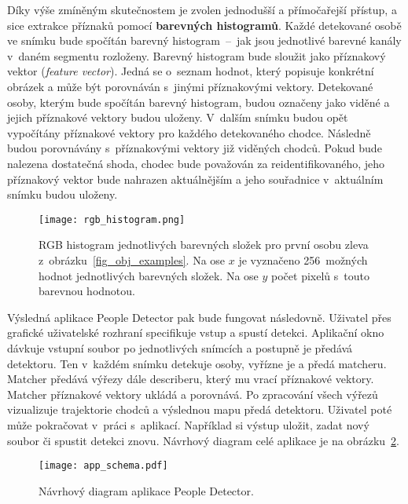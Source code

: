 Díky výše zmíněným skutečnostem je zvolen jednodušší a přímočařejší přístup, a sice extrakce příznaků pomocí \textbf{barevných histogramů}. Každé detekované osobě ve snímku bude spočítán barevný histogram~--~jak jsou jednotlivé barevné kanály v~daném segmentu rozloženy. Barevný histogram bude sloužit jako příznakový vektor (\textit{feature vector}). Jedná se o~seznam hodnot, který popisuje konkrétní obrázek a může být porovnáván s~jinými příznakovými vektory. Detekované osoby, kterým bude spočítán barevný histogram, budou označeny jako viděné a jejich příznakové vektory budou uloženy. V~dalším snímku budou opět vypočítány příznakové vektory pro každého detekovaného chodce. Následně budou porovnávány s~příznakovými vektory již viděných chodců. Pokud bude nalezena dostatečná shoda, chodec bude považován za reidentifikovaného, jeho příznakový vektor bude nahrazen aktuálnějším a jeho souřadnice v~aktuálním snímku budou uloženy.

\begin{figure}[H]
    \centering
    \texttt{[image: rgb\_histogram.png]}
    \caption[Příklad RGB histogramu]{RGB histogram jednotlivých barevných složek pro první osobu zleva z~obrázku~\ref{fig_obj_examples}. Na ose $x$ je vyznačeno 256~možných hodnot jednotlivých barevných složek. Na ose $y$ počet pixelů s~touto barevnou hodnotou.}
    \label{fig_histogram}
\end{figure}

Výsledná aplikace People Detector pak bude fungovat následovně. Uživatel přes grafické uživatelské rozhraní specifikuje vstup a spustí detekci. Aplikační okno dávkuje vstupní soubor po jednotlivých snímcích a postupně je předává detektoru. Ten v~každém snímku detekuje osoby, vyřízne je a předá matcheru. Matcher předává výřezy dále describeru, který mu vrací příznakové vektory. Matcher příznakové vektory ukládá a porovnává. Po zpracování všech výřezů vizualizuje trajektorie chodců a výslednou mapu předá detektoru. Uživatel poté může pokračovat v~práci s~aplikací. Například si výstup uložit, zadat nový soubor či spustit detekci znovu. Návrhový diagram celé aplikace je na obrázku~\ref{fig_app_schema}.

\begin{figure}[H]
    \centering
    \texttt{[image: app\_schema.pdf]}
    \caption[Návrhový diagram aplikace People Detector]{Návrhový diagram aplikace People Detector.}
    \label{fig_app_schema}
\end{figure}


